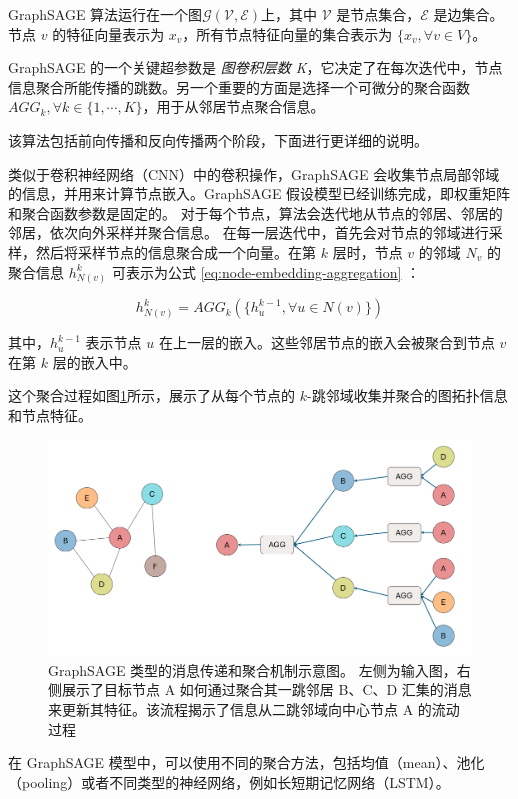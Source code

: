 \documentclass{article}
\begin{document}
GraphSAGE 算法运行在一个图$\mathcal{G(V, E)}$上，其中 $\mathcal{V}$
是节点集合，$\mathcal{E}$ 是边集合。节点 $v$ 的特征向量表示为 $x_v$，所有节点特征向量的集合表示为 $\{x_v,
\forall v \in V\}$。

GraphSAGE 的一个关键超参数是 \textit{图卷积层数 K}，它决定了在每次迭代中，节点信息聚合所能传播的跳数。另一个重要的方面是选择一个可微分的聚合函数$AGG_k,\forall k \in \{1,\cdots,K\}$，用于从邻居节点聚合信息。

该算法包括前向传播和反向传播两个阶段，下面进行更详细的说明。

类似于卷积神经网络（CNN）中的卷积操作，GraphSAGE 会收集节点局部邻域的信息，并用来计算节点嵌入。GraphSAGE
假设模型已经训练完成，即权重矩阵和聚合函数参数是固定的。
对于每个节点，算法会迭代地从节点的邻居、邻居的邻居，依次向外采样并聚合信息。
在每一层迭代中，首先会对节点的邻域进行采样，然后将采样节点的信息聚合成一个向量。在第 $k$ 层时，节点 $v$ 的邻域 $N_v$
的聚合信息 $h_{N(v)}^k$ 可表示为公式 \eqref{eq:node-embedding-aggregation}
\cite{Kumar2020}：

\begin{equation}
  h_{N(v)}^k=AGG_k (\{h_u^{k-1},\forall u \in N(v)\})
  \label{eq:node-embedding-aggregation}
\end{equation}

其中，$h_u^{k-1}$ 表示节点 $u$ 在上一层的嵌入。这些邻居节点的嵌入会被聚合到节点 $v$ 在第 $k$ 层的嵌入中。

这个聚合过程如图\ref{fig:graph-aggration}所示，展示了从每个节点的 $k$-跳邻域收集并聚合的图拓扑信息和节点特征。

\begin{figure}[h]
  \centering
  \includegraphics[width=0.6\linewidth]{images/graph-aggration.png}
  \caption{GraphSAGE 类型的消息传递和聚合机制示意图。 左侧为输入图，右侧展示了目标节点 A 如何通过聚合其一跳邻居
  B、C、D 汇集的消息来更新其特征。该流程揭示了信息从二跳邻域向中心节点 A 的流动过程}
  \label{fig:graph-aggration}
\end{figure}

在 GraphSAGE
模型中，可以使用不同的聚合方法，包括均值（mean）、池化（pooling）或者不同类型的神经网络，例如长短期记忆网络（LSTM）\cite{hamilton2018inductiverepresentationlearninglarge}。
\end{document}
